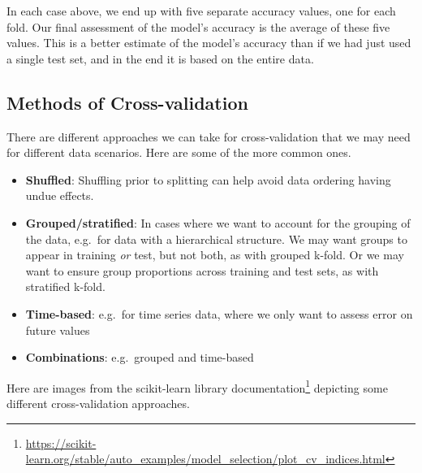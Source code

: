 \documentclass[
  letterpaper,
]{krantz}
\providecommand{\tightlist}{%
  \setlength{\itemsep}{0pt}\setlength{\parskip}{0pt}}\usepackage{longtable,booktabs,array}
\DeclareRobustCommand{\href}[2]{#2\footnote{\url{#1}}}
\begin{document}
In each case above, we end up with five separate accuracy values, one
for each fold. Our final assessment of the model's accuracy is the
average of these five values. This is a better estimate of the model's
accuracy than if we had just used a single test set, and in the end it
is based on the entire data.

\subsection{Methods of
Cross-validation}\label{methods-of-cross-validation}

There are different approaches we can take for cross-validation that we
may need for different data scenarios. Here are some of the more common
ones.

\begin{itemize}
\tightlist
\item
  \textbf{Shuffled}: Shuffling prior to splitting can help avoid data
  ordering having undue effects.
\item
  \textbf{Grouped/stratified}: In cases where we want to account for the
  grouping of the data, e.g.~for data with a hierarchical structure. We
  may want groups to appear in training \emph{or} test, but not both, as
  with grouped k-fold. Or we may want to ensure group proportions across
  training and test sets, as with stratified k-fold.
\item
  \textbf{Time-based}: e.g.~for time series data, where we only want to
  assess error on future values
\item
  \textbf{Combinations}: e.g.~grouped and time-based
\end{itemize}

Here are images from the
\href{https://scikit-learn.org/stable/auto_examples/model_selection/plot_cv_indices.html}{scikit-learn
library documentation} depicting some different cross-validation
approaches.
\end{document}
